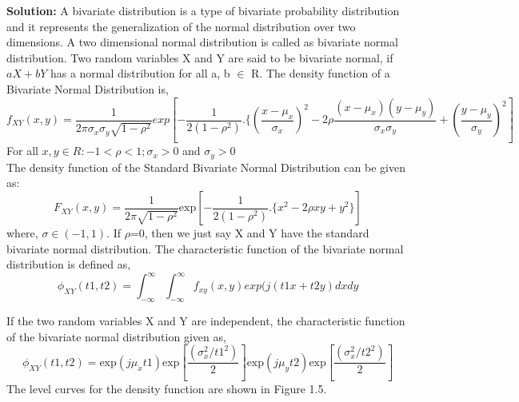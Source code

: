 \noindent \textbf{Solution:} A bivariate distribution is a type of bivariate probability distribution and it represents the generalization of the normal distribution over two dimensions. A two dimensional normal distribution is called as bivariate normal distribution. Two random variables X and Y are said to be bivariate normal, if $aX+bY$ has a normal distribution for all a, b $\in$ R. The density function of a Bivariate Normal Distribution is,\\
$$f_{XY}(x,y)=\frac{1}{2\pi\sigma_x\sigma_y\sqrt{1-\rho^2}}exp\left[-\frac{1}{2(1-\rho^2)}.\{(\frac{x-\mu_x}{\sigma_x})^2-2\rho\frac{(x-\mu_x)(y-\mu_y)}{\sigma_x\sigma_y}+(\frac{y-\mu_y}{\sigma_y})^2\right]$$
For all   $x, y \in R: -1< \rho <1;   \sigma_x >0$ and $\sigma_y >0$\\
\noindent The density function of the Standard Bivariate Normal Distribution can be given as:\\
$$F_{XY}(x,y)=\frac{1}{2\pi\sqrt{1-\rho^2}}\text{exp}\left[-\frac{1}{2(1-\rho^2)}.\{x^2-2\rho xy+y^2\}\right]$$
where, $\sigma \in (-1, 1)$. If $\rho$=0, then we just say X and Y have the standard bivariate normal distribution.
\noindent The characteristic function of the bivariate normal distribution is defined as,
$$\phi_{XY}(t1,t2)=\int_{-\infty}^{\infty}\int_{-\infty}^{\infty} f_{xy}(x,y)exp(j(t1x+t2y)dxdy$$

\noindent If the two random variables X and Y are independent, the characteristic function of the bivariate normal distribution given as,
$$\phi_{XY}(t1,t2)=\text{exp}(j\mu_xt1)\text{exp}\left[\frac{(\sigma_x^2/t1^2)}{2}\right]\text{exp}(j\mu_yt2)\text{exp}\left[\frac{(\sigma_x^2/t2^2)}{2}\right]$$
 \noindent The level curves for the density function are shown in Figure 1.5. 
 

